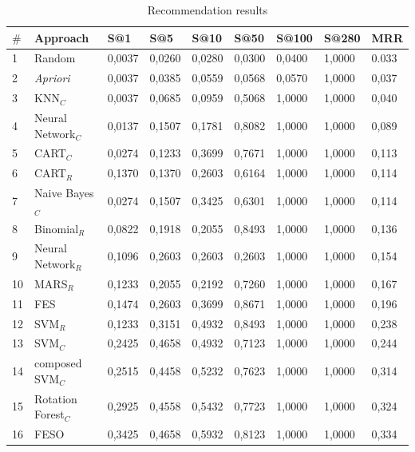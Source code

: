 \documentclass[10pt,letterpaper]{article}
\begin{document}
\begin{table}[!htp]
	\centering
	\caption{Recommendation results}
	\begin{tabular}{|l|l|l|l|l|l|l|l|l|} \hline
		\textbf{\(\mathbf{\#}\)} & \textbf{Approach}&\textbf{S@1}&\textbf{S@5} & \textbf{S@10} & \textbf{S@50} & \textbf{S@100} & \textbf{S@280} & \textbf{MRR} \\ \hline
		
		1  & Random				& 0,0037 & 0,0260 & 0,0280 & 0,0300 & 0,0400 & 1,0000 & 0.033 \\ \hline
		2  & \emph{Apriori}			& 0,0037 & 0,0385 & 0,0559 & 0,0568 & 0,0570 & 1,0000 & 0,037 \\ \hline
		3  & KNN\(_C\)				& 0,0037 & 0,0685 & 0,0959 & 0,5068 & 1,0000 & 1,0000 & 0,040 \\ \hline
		4  & Neural Network\(_C\)		& 0,0137 & 0,1507 & 0,1781 & 0,8082 & 1,0000 & 1,0000 & 0,089 \\ \hline
		5  & CART\(_C\)				& 0,0274 & 0,1233 & 0,3699 & 0,7671 & 1,0000 & 1,0000 & 0,113 \\ \hline
		6  & CART\(_R\)    			& 0,1370 & 0,1370 & 0,2603 & 0,6164 & 1,0000 & 1,0000 & 0,114 \\ \hline
		7  & Naive Bayes\(_C\)     	& 0,0274 & 0,1507 & 0,3425 & 0,6301 & 1,0000 & 1,0000 & 0,114 \\ \hline
		8  & Binomial\(_R\) 		& 0,0822 & 0,1918 & 0,2055 & 0,8493 & 1,0000 & 1,0000 & 0,136 \\ \hline
		9  & Neural Network\(_R\)     	& 0,1096 & 0,2603 & 0,2603 & 0,2603 & 1,0000 & 1,0000 & 0,154 \\ \hline
		10 & MARS\(_R\)     		& 0,1233 & 0,2055 & 0,2192 & 0,7260 & 1,0000 & 1,0000 & 0,167 \\ \hline
		11 & FES           			& 0,1474 & 0,2603 & 0,3699 & 0,8671 & 1,0000 & 1,0000 & 0,196 \\ \hline
		12 & SVM\(_R\)     			& 0,1233 & 0,3151 & 0,4932 & 0,8493 & 1,0000 & 1,0000 & 0,238 \\ \hline
		13 & SVM\(_C\)    			& 0,2425 & 0,4658 & 0,4932 & 0,7123 & 1,0000 & 1,0000 & 0,244 \\ \hline
		14 & composed SVM\(_C\)		& 0,2515 & 0,4458 & 0,5232 & 0,7623 & 1,0000 & 1,0000 & 0,314 \\ \hline
		15 & Rotation Forest\(_C\)  & 0,2925 & 0,4558 & 0,5432 & 0,7723 & 1,0000 & 1,0000 & 0,324 \\ \hline
		16 & FESO          			& 0,3425 & 0,4658 & 0,5932 & 0,8123 & 1,0000 & 1,0000 & 0,334 \\ \hline
	\end{tabular}
	\label{tb_resultadosExperimentos}
	\vspace{0.1cm}
\end{table}
\egroup
\end{document}
